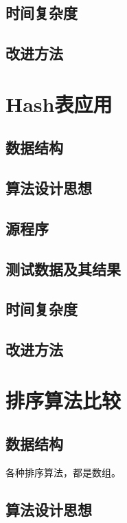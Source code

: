 \documentclass[a4paper,11pt,UTF8]{ctexart}
\begin{document}
\subsection{时间复杂度}
\subsection{改进方法}

\section{Hash表应用}
\subsection{数据结构}
\subsection{算法设计思想}
\subsection{源程序}
\subsection{测试数据及其结果}
\subsection{时间复杂度}
\subsection{改进方法}

\section{排序算法比较}
\subsection{数据结构}
各种排序算法，都是数组。
\subsection{算法设计思想}
\end{document}
